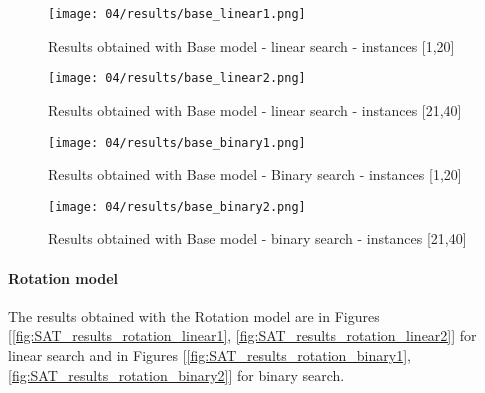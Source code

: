   \pagebreak
  \begin{figure}[H]
    \centering
    \texttt{[image: 04/results/base\_linear1.png]}
    \caption{
      Results obtained with Base model - linear search - instances [1,20]
    }
    \label{fig:SAT_results_base_linear1}
  \end{figure}
  \begin{figure}[H]
    \centering
    \texttt{[image: 04/results/base\_linear2.png]}
    \caption{
      Results obtained with Base model - linear search - instances [21,40]
    }
    \label{fig:SAT_results_base_linear2}
  \end{figure}    

  \begin{figure}[H]
    \centering
    \texttt{[image: 04/results/base\_binary1.png]}
    \caption{
      Results obtained with Base model - Binary search - instances [1,20]
    }
    \label{fig:SAT_results_base_binary1}
  \end{figure}
  \begin{figure}[H]
    \centering
    \texttt{[image: 04/results/base\_binary2.png]}
    \caption{
      Results obtained with Base model - binary search - instances [21,40]
    }
    \label{fig:SAT_results_base_binary2}
  \end{figure} 
  

  \paragraph{Rotation model}
  The results obtained with the Rotation model are in Figures [\ref{fig:SAT_results_rotation_linear1}, \ref{fig:SAT_results_rotation_linear2}]
  for linear search and in Figures [\ref{fig:SAT_results_rotation_binary1}, \ref{fig:SAT_results_rotation_binary2}] for binary search.
  
